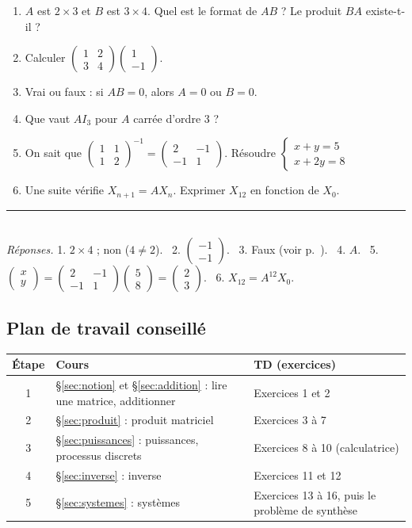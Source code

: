\documentclass[a4paper,11pt]{article}
\newcommand{\M}[1]{\begin{pmatrix}#1\end{pmatrix}}
\begin{document}
\begin{exemple}
\begin{enumerate}
  \item $A$ est $2\times 3$ et $B$ est $3\times 4$. Quel est le format de $AB$ ? Le produit $BA$ existe-t-il ?
  \item Calculer $\M{1 & 2\\ 3 & 4}\M{1\\ -1}$.
  \item Vrai ou faux : si $AB=0$, alors $A=0$ ou $B=0$.
  \item Que vaut $AI_3$ pour $A$ carrée d'ordre 3 ?
  \item On sait que $\M{1 & 1\\ 1 & 2}^{-1} = \M{2 & -1\\ -1 & 1}$. Résoudre $\left\{\begin{array}{l}x+y=5\\ x+2y=8\end{array}\right.$
  \item Une suite vérifie $X_{n+1}=AX_n$. Exprimer $X_{12}$ en fonction de $X_0$.
\end{enumerate}
\vspace{2pt}
\rule{\linewidth}{0.4pt}\\
\footnotesize\textit{Réponses.} 1. $2\times 4$ ; non ($4\neq 2$). \ 2. $\M{-1\\-1}$. \ 3. Faux (voir p.~\pageref{att:produitnul}). \ 4. $A$. \ 5. $\M{x\\y}=\M{2 & -1\\ -1 & 1}\M{5\\8}=\M{2\\3}$. \ 6. $X_{12}=A^{12}X_0$.
\end{exemple}

\subsection{Plan de travail conseillé}\label{subsec:plan}

\begin{center}
\renewcommand{\arraystretch}{1.35}
\begin{tabular}{|c|p{6.5cm}|p{7.5cm}|}
\hline
\rowcolor{uimmlightblue}
\textbf{Étape} & \textbf{Cours} & \textbf{TD (exercices)} \\
\hline
1 & §\ref{sec:notion} et §\ref{sec:addition} : lire une matrice, additionner & Exercices 1 et 2 \\
\hline
2 & §\ref{sec:produit} : produit matriciel & Exercices 3 à 7 \\
\hline
3 & §\ref{sec:puissances} : puissances, processus discrets & Exercices 8 à 10 (calculatrice) \\
\hline
4 & §\ref{sec:inverse} : inverse & Exercices 11 et 12 \\
\hline
5 & §\ref{sec:systemes} : systèmes & Exercices 13 à 16, puis le problème de synthèse \\
\hline
\end{tabular}
\end{center}
\end{document}
